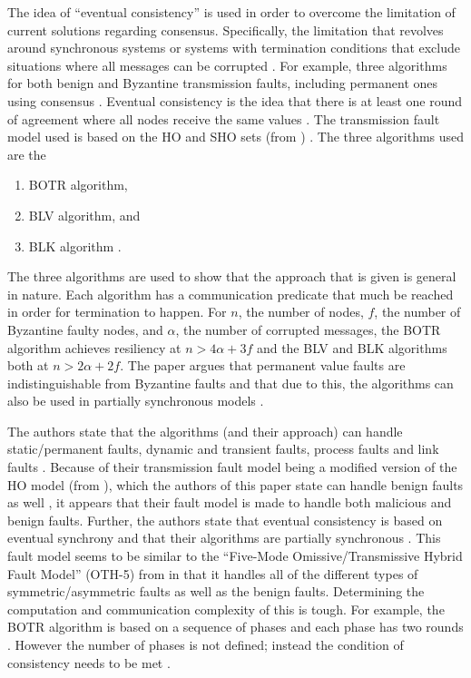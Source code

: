 \documentclass[twoside, conference]{IEEEtran}%
\begin{document}
The idea of  ``eventual consistency'' is used in order to overcome the limitation of current solutions regarding consensus.  Specifically, the limitation that revolves around synchronous systems or systems with termination conditions that exclude situations where all messages can be corrupted \cite{Milosevic2014}.  For example, three algorithms for both benign and Byzantine transmission faults, including permanent ones using consensus \cite{Milosevic2014}.  Eventual consistency is the idea that there is at least one round of agreement where all nodes receive the same values \cite{Milosevic2014}.  The transmission fault model used is based on the HO and SHO sets (from \cite{Biely2007}) \cite{Milosevic2014}.  The three algorithms used are the 
\begin{enumerate}
	\item BOTR algorithm,
	\item BLV algorithm, and
	\item BLK algorithm \cite{Milosevic2014}.
\end{enumerate}
The three algorithms are used to show that the approach that is given is general in nature.  Each algorithm has a communication predicate that much be reached in order for termination to happen.  For $n$, the number of nodes, $f$, the number of Byzantine faulty nodes, and $\alpha$, the number of corrupted messages, the BOTR algorithm achieves resiliency at $n > 4\alpha + 3f$ and the BLV and BLK algorithms both at $n > 2\alpha + 2f$\cite{Milosevic2014}.  The paper argues that permanent value faults are indistinguishable from Byzantine faults and that due to this, the algorithms can also be used in partially synchronous models \cite{Milosevic2014}.  

The authors state that the algorithms (and their approach) can handle static/permanent faults, dynamic and transient faults, process faults and link faults \cite{Milosevic2014}.  Because of their transmission fault model being a modified version of the HO model (from \cite{Biely2007}), which the authors of this paper state can handle benign faults as well \cite{Milosevic2014}, it appears that their fault model is made to handle both malicious and benign faults.  Further, the authors state that eventual consistency is based on eventual synchrony \cite{Milosevic2014} and that their algorithms are partially synchronous \cite{Milosevic2014}.  This fault model seems to be similar to the ``Five-Mode Omissive/Transmissive Hybrid Fault Model'' (OTH-5) from \cite{Azadmanesh2000} in that it handles all of the different types of symmetric/asymmetric faults as well as the benign faults.  Determining the computation and communication complexity of this is tough.  For example, the BOTR algorithm is based on a sequence of phases and each phase has two rounds \cite{Milosevic2014}.  However the number of phases is not defined; instead the condition of consistency needs to be met \cite{Milosevic2014}.
\end{document}
